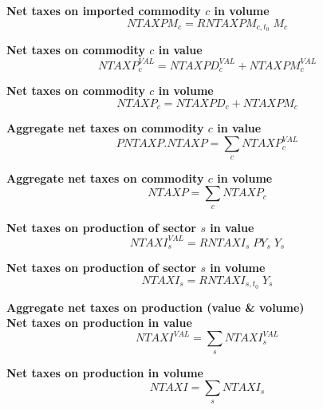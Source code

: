 \documentclass[12pt]{article}
\numberwithin{equation}{section}
\begin{document}
\noindent\textbf{Net taxes on imported commodity $c$ in volume} \\
\begin{dmath}
NTAXPM_{c} = RNTAXPM_{c, t_{0}} \; M_{c}
\end{dmath}



\noindent\textbf{Net taxes on commodity $c$ in value} \\
\begin{dmath}
NTAXP^{VAL}_{c} = NTAXPD^{VAL}_{c} + NTAXPM^{VAL}_{c}
\end{dmath}

\noindent\textbf{Net taxes on commodity $c$ in volume} \\
\begin{dmath}
NTAXP_{c} = NTAXPD_{c} + NTAXPM_{c}
\end{dmath}

\noindent\textbf{Aggregate net taxes on commodity $c$ in value} \\
\begin{dmath}
PNTAXP . NTAXP = \sum_{c} NTAXP^{VAL}_{c}
\end{dmath}

\noindent\textbf{Aggregate net taxes on commodity $c$ in volume} \\
\begin{dmath}
NTAXP = \sum_{c} NTAXP_{c}
\end{dmath}

\noindent\textbf{Net taxes on production of sector $s$ in value} \\
\begin{dmath}
NTAXI^{VAL}_{s} = RNTAXI_{s} \; PY_{s} \; Y_{s}
\end{dmath}

\noindent\textbf{Net taxes on production of sector $s$ in volume} \\
\begin{dmath}
NTAXI_{s} = RNTAXI_{s, t_{0}} \; Y_{s}
\end{dmath}

\noindent\textbf{Aggregate net taxes on production (value \& volume)} \\


\noindent\textbf{Net taxes on production in value} \\
\begin{dmath}
NTAXI^{VAL} = \sum_{s} NTAXI^{VAL}_{s}
\end{dmath}

\noindent\textbf{Net taxes on production in volume} \\
\begin{dmath}
NTAXI = \sum_{s} NTAXI_{s}
\end{dmath}
\end{document}
